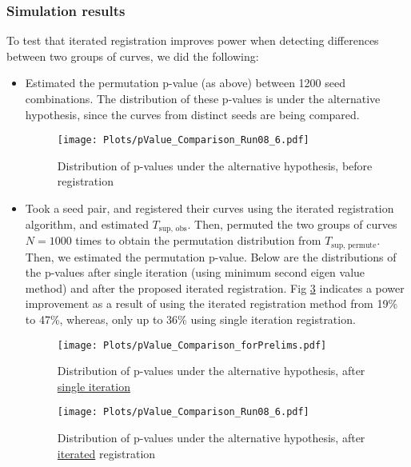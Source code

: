 \subsubsection*{Simulation results}
To test that iterated registration improves power when detecting differences between two groups of curves, we did the following:
\begin{itemize}
\item Estimated the permutation p-value (as above) between 1200 seed combinations. The distribution of these p-values is under the alternative hypothesis, since the curves from distinct seeds are being compared.
\begin{figure}[H]
\begin{center}
\texttt{[image: Plots/pValue\_Comparison\_Run08\_6.pdf]}
\end{center}
\caption{Distribution of p-values under the alternative hypothesis, before registration}
\label{fig:BeforeRegist}
\end{figure}

\item Took a seed pair, and registered their curves using the iterated registration algorithm, and estimated $T_{\text{sup, obs}}$. Then, permuted the two groups of curves $N = 1000$ times to obtain the permutation distribution from  $T_{\text{sup, permute}}$. Then, we estimated the permutation p-value. Below are the distributions of the p-values after single iteration (using minimum second eigen value method) and after the proposed iterated registration. Fig \ref{fig:AfterRegist} indicates a power improvement as a result of using the iterated registration method from 19\% to 47\%, whereas, only up to 36\% using single iteration registration. 

\vspace{-1cm}
\begin{figure}[H]
\begin{center}
\texttt{[image: Plots/pValue\_Comparison\_forPrelims.pdf]}
\end{center}
\caption{Distribution of p-values under the alternative hypothesis, after {\underline{single iteration}}}
\label{fig:AfterSingleIter}
\end{figure}

\vspace{-1cm}
\begin{figure}[H]
\begin{center}
\texttt{[image: Plots/pValue\_Comparison\_Run08\_6.pdf]}
\end{center}
\caption{Distribution of p-values under the alternative hypothesis, after {\underline{iterated}} registration}
\label{fig:AfterRegist}
\end{figure}


\end{itemize} 


